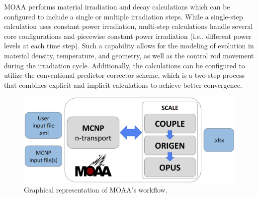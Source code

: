 \documentclass{style/nseJournal}
\begin{document}
MOAA performs material irradiation and decay calculations which can be configured to include a single or multiple irradiation steps.
While a single-step calculation uses constant power irradiation, multi-step calculations handle several core configurations and piecewise constant power irradiation (i.e., different power levels at each time step).
Such a capability allows for the modeling of evolution in material density, temperature, and geometry, as well as the control rod movement during the irradiation cycle.
Additionally, the calculations can be configured to utilize the conventional predictor-corrector scheme, which is a two-step process that combines explicit and implicit calculations to achieve better convergence.

\begin{figure}[htbp!]
  \begin{center}
    \includegraphics[width=0.90\linewidth]{figures/diagram_2}
  \end{center}
  \caption{Graphical representation of MOAA's workflow.}
  \label{fig:workflow_1}
\end{figure}


\end{document}
